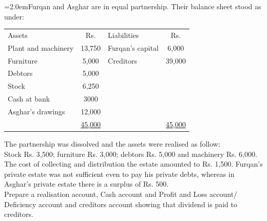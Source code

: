 \documentclass[11pt,a4paper]{article}
\newcommand{\lqn}[2]{\Needspace{6\baselineskip}\par\medskip\noindent\hangindent=2.0em\hangafter=1\makebox[2.0em][l]{\textbf{#1.}}#2\par}
\begin{document}
\lqn{121}{Furqan and Asghar are in equal partnership. Their balance sheet stood as under:\par
\par\smallskip\noindent\hspace*{1.2em}\begin{tabular}{|lclc|}
\hline
Assets & Rs. & Liabilities & Rs. \\
Plant and machinery & 13,750 & Furqan’s capital & 6,000 \\
Furniture & 5,000 & Creditors & 39,000 \\
Debtors & 5,000 &  &  \\
Stock & 6,250 &  &  \\
Cash at bank & 3000 &  &  \\
Asghar’s drawings & 12,000 &  &  \\
 & \underline{45,000} &  & \underline{45,000} \\
\hline
\end{tabular}\par\smallskip
The partnership was dissolved and the assets were realised as follow:\\
Stock Rs. 3,500; furniture Rs. 3,000; debtors Rs. 5,000 and machinery Rs. 6,000.\\
The cost of collecting and distribution the estate amounted to Rs. 1,500. Furqan’s private estate was not sufficient even to pay his private debts, whereas in Asghar’s private estate there is a surplus of Rs. 500.\\
Prepare a realisation account, Cash account and Profit and Loss account/ Deficiency account and creditors account showing that dividend is paid to creditors.\par
}
\end{document}
